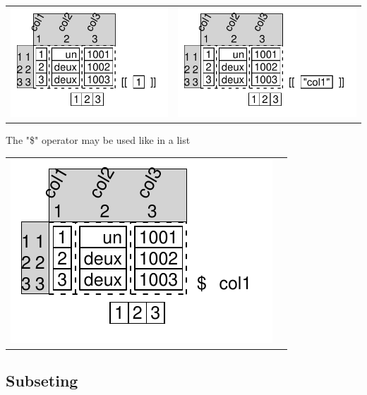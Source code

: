 \documentclass[pdflatex]{article}
\begin{document}
\begin{tabular}{cc}
\includegraphics{dataframe_list_like_extraction_3.pdf} & \includegraphics{dataframe_list_like_extraction_2.pdf}
\end{tabular}

The "\$" operator may be used like in a list

\begin{tabular}{cc}
\includegraphics{dataframe_list_like_extraction_1.pdf}
\end{tabular}

\subsection{Subseting}
\end{document}
